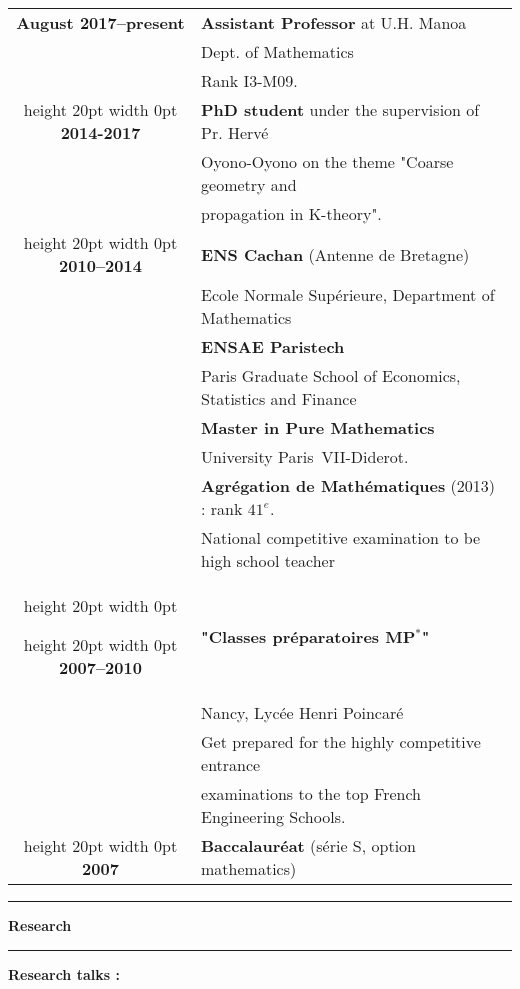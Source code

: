 \documentclass[a4paper,11pt]{article}
\newcommand\espace{\vrule height 20pt width 0pt}
\newcommand{\titre}[1]{%
	\begin{center}
	\bigskip
	\rule{\textwidth}{1pt}
	\par\vspace{0.1cm}
        \textbf{\large #1}
	\par\rule{\textwidth}{1pt}
	\end{center}
	\bigskip
	}
\begin{document}
\begin{tabular}{cp{}}

\textbf{August 2017--present} &  \textbf{Assistant Professor} at U.H. Manoa  \\
						& Dept. of Mathematics\\
						& Rank I3-M09. \\
\espace
\textbf{2014-2017} &  \textbf{PhD student} under the supervision of Pr. Hervé  \\
						& Oyono-Oyono on the theme "Coarse geometry and \\
						& propagation in K-theory". \\
\espace
\textbf{2010--2014} &  \textbf{ENS Cachan} (Antenne de Bretagne) \\
				    & 	Ecole Normale Supérieure, Department of Mathematics \\
                              & \textbf{ENSAE Paristech}\\
				&	Paris Graduate School of Economics, Statistics and Finance\\
                                   & \textbf{Master in Pure Mathematics}\\  & University Paris~VII-Diderot. \\
                                   & \textbf{Agrégation de Mathématiques} (2013) : rank $41^e$. \\
				& National competitive examination to be high school teacher\\
\espace

\espace
\textbf{2007--2010} &\textbf{ "Classes préparatoires MP$^*$" } \\
					& Nancy, Lycée Henri Poincaré\\
					& Get prepared for the highly competitive entrance \\
				& examinations to the top French Engineering Schools.\\

\espace
\textbf{2007} & \textbf{Baccalauréat} (série S, option mathematics) 
 \\

\end{tabular}


\titre{Research}

\textbf{Research talks :}\\
\end{document}
